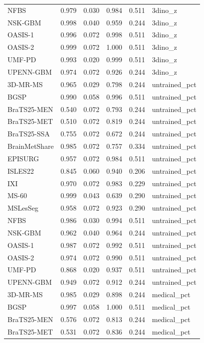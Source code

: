 \begin{tabular}{lrrrrl}
NFBS & 0.979 & 0.030 & 0.984 & 0.511 & 3dino\_z \\
NSK-GBM & 0.998 & 0.040 & 0.959 & 0.244 & 3dino\_z \\
OASIS-1 & 0.996 & 0.072 & 0.998 & 0.511 & 3dino\_z \\
OASIS-2 & 0.999 & 0.072 & 1.000 & 0.511 & 3dino\_z \\
UMF-PD & 0.993 & 0.020 & 0.999 & 0.511 & 3dino\_z \\
UPENN-GBM & 0.974 & 0.072 & 0.926 & 0.244 & 3dino\_z \\
3D-MR-MS & 0.965 & 0.029 & 0.798 & 0.244 & untrained\_pct \\
BGSP & 0.990 & 0.058 & 0.996 & 0.511 & untrained\_pct \\
BraTS25-MEN & 0.540 & 0.072 & 0.793 & 0.244 & untrained\_pct \\
BraTS25-MET & 0.510 & 0.072 & 0.819 & 0.244 & untrained\_pct \\
BraTS25-SSA & 0.755 & 0.072 & 0.672 & 0.244 & untrained\_pct \\
BrainMetShare & 0.985 & 0.072 & 0.757 & 0.334 & untrained\_pct \\
EPISURG & 0.957 & 0.072 & 0.984 & 0.511 & untrained\_pct \\
ISLES22 & 0.845 & 0.060 & 0.940 & 0.206 & untrained\_pct \\
IXI & 0.970 & 0.072 & 0.983 & 0.229 & untrained\_pct \\
MS-60 & 0.999 & 0.043 & 0.639 & 0.290 & untrained\_pct \\
MSLesSeg & 0.958 & 0.072 & 0.923 & 0.290 & untrained\_pct \\
NFBS & 0.986 & 0.030 & 0.994 & 0.511 & untrained\_pct \\
NSK-GBM & 0.962 & 0.040 & 0.964 & 0.244 & untrained\_pct \\
OASIS-1 & 0.987 & 0.072 & 0.992 & 0.511 & untrained\_pct \\
OASIS-2 & 0.974 & 0.072 & 0.990 & 0.511 & untrained\_pct \\
UMF-PD & 0.868 & 0.020 & 0.937 & 0.511 & untrained\_pct \\
UPENN-GBM & 0.949 & 0.072 & 0.912 & 0.244 & untrained\_pct \\
3D-MR-MS & 0.985 & 0.029 & 0.898 & 0.244 & medical\_pct \\
BGSP & 0.997 & 0.058 & 1.000 & 0.511 & medical\_pct \\
BraTS25-MEN & 0.576 & 0.072 & 0.813 & 0.244 & medical\_pct \\
BraTS25-MET & 0.531 & 0.072 & 0.836 & 0.244 & medical\_pct \\

\end{tabular}

